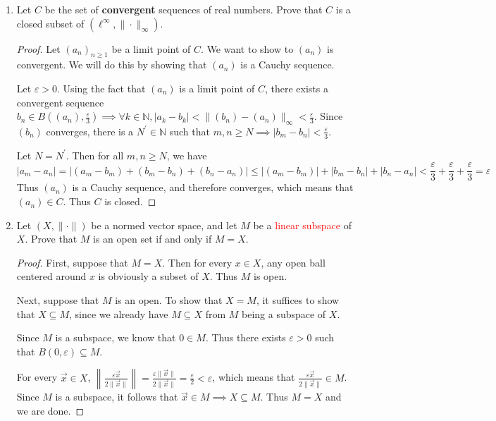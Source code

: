 \documentclass{article}
\theoremstyle{plain} %
\numberwithin{thm}{section} %
\theoremstyle{definition}
\begin{document}
\begin{enumerate}[label=(\alph*)]
            \item Let $C$ be the set of \textbf{convergent} sequences of real numbers. Prove that $C$ is a closed subset of $(\ell^\infty,\|\cdot\|_\infty)$.
    
            \begin{proof}
                Let \((a_n)_{n\geq1}\) be a limit point of \(C\). We want to show to \((a_n)\) is convergent. We will do this by showing that \((a_n)\) is a Cauchy sequence.
    
                Let \(\varepsilon > 0\). Using the fact that \((a_n)\) is a limit point of \(C\), there exists a convergent sequence \(b_n \in B((a_n), \frac{\varepsilon}{3}) \implies \forall k \in \mathbb{N}, |a_k - b_k| < \|(b_n) - (a_n)\| _\infty < \frac{\varepsilon}{3}\). Since \((b_n)\) converges, there is a \(N^\prime \in \mathbb{N}\) such that \(m,n \geq N \implies |b_m - b_n| < \frac{\varepsilon}{3}\).
                
                Let \(N = N^\prime\). Then for all \(m,n \geq N\), we have
                \[
                    |a_m - a_n| = |(a_m - b_m) + (b_m - b_n) + (b_n - a_n)| \leq |(a_m - b_m)| + |b_m - b_n| + |b_n - a_n| < \frac{\varepsilon}{3} + \frac{\varepsilon}{3} + \frac{\varepsilon}{3} = \varepsilon
                \]
                Thus \((a_n)\) is a Cauchy sequence, and therefore converges, which means that \((a_n) \in C\). Thus \(C\) is closed.
    
            \end{proof}
            \item Let $(X,\|\cdot\|)$ be a normed vector space, and let $M$ be a \textcolor{red}{linear subspace} of $X$. Prove that $M$ is an open set if and only if $M=X$.
            
            \begin{proof}
                First, suppose that \(M=X\). Then for every \(x \in X\), any open ball centered around \(x\) is obviously a subset of \(X\). Thus \(M\) is open.
    
                Next, suppose that \(M\) is an open. To show that \(X=M\), it suffices to show that \(X \subseteq M\), since we already have \(M \subseteq X\) from \(M\) being a subspace of \(X\).
    
                Since \(M\) is a subspace, we know that \(0 \in M\). Thus there exists \(\varepsilon > 0\) such that \(B(0, \varepsilon) \subseteq M\).
                
                For every \(\vec{x} \in X\), \(\left\lVert \frac{\varepsilon \vec{x}}{2\|\vec{x}\|} \right\rVert = \frac{\varepsilon\|\vec{x}\|}{2\|\vec{x}\|} = \frac{\varepsilon}{2} < \varepsilon\), which means that \(\frac{\varepsilon \vec{x}}{2\|\vec{x}\|} \in M\). Since \(M\) is a subspace, it follows that \(\vec{x} \in M \implies X \subseteq M\). Thus \(M=X\) and we are done.
    
            \end{proof}
        \end{enumerate}
\end{document}
